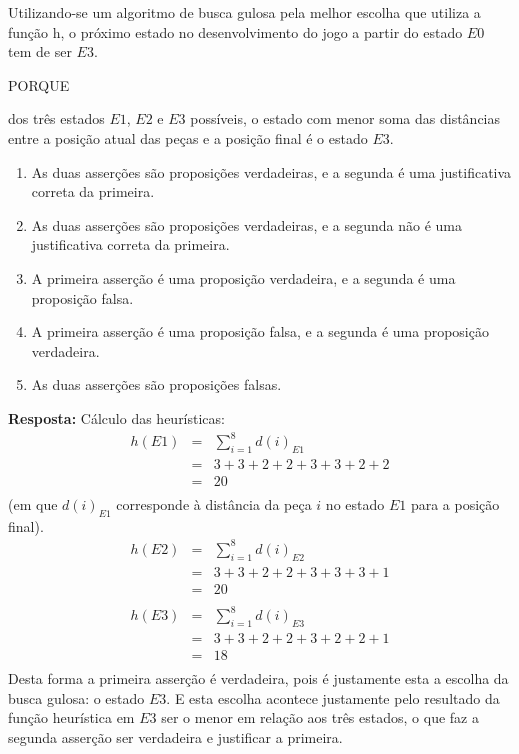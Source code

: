 \documentclass[12pt,a4paper,oneside]{article}
\begin{document}
\begin{enumerate}
	Utilizando-se um algoritmo de busca gulosa pela melhor escolha que utiliza a função h, o próximo estado no desenvolvimento do jogo a partir do estado $E0$ tem de ser $E3$.
	
	\begin{center}
		PORQUE
	\end{center}
	
	dos três estados $E1$, $E2$ e $E3$ possíveis, o estado com menor soma das distâncias entre a posição atual das peças e a posição final é o estado $E3$.
	
	\begin{enumerate}
		\item As duas asserções são proposições verdadeiras, e a segunda é uma justificativa correta da primeira.
		\item As duas asserções são proposições verdadeiras, e a segunda não é uma justificativa correta da primeira.
		\item A primeira asserção é uma proposição verdadeira, e a segunda é uma proposição falsa.
		\item A primeira asserção é uma proposição falsa, e a segunda é uma proposição verdadeira.
		\item As duas asserções são proposições falsas.
	\end{enumerate}

	{\color{blue} 
		{\bf Resposta:} Cálculo das heurísticas:
		\begin{eqnarray*}
		h(E1) 	&=& \sum_{i=1}^{8} d(i)_{E1}\\
				&=& 3+3+2+2+3+3+2+2\\
				&=& 20\\
		\end{eqnarray*}
		(em que $d(i)_{E1}$ corresponde à distância da peça $i$ no estado $E1$ para a posição final).
		\begin{eqnarray*}
			h(E2) 	&=& \sum_{i=1}^{8} d(i)_{E2}\\
			&=& 3+3+2+2+3+3+3+1\\
			&=& 20\\
		\end{eqnarray*}
		\begin{eqnarray*}
			h(E3) 	&=& \sum_{i=1}^{8} d(i)_{E3}\\
			&=& 3+3+2+2+3+2+2+1\\
			&=& 18\\
		\end{eqnarray*}
		Desta forma a primeira asserção é verdadeira, pois é justamente esta a escolha da busca gulosa: o estado $E3$. E esta escolha acontece justamente pelo resultado da função heurística em $E3$ ser o menor em relação aos três estados, o que faz a segunda asserção ser verdadeira e justificar a primeira.
		
}
\end{enumerate}
\end{document}
